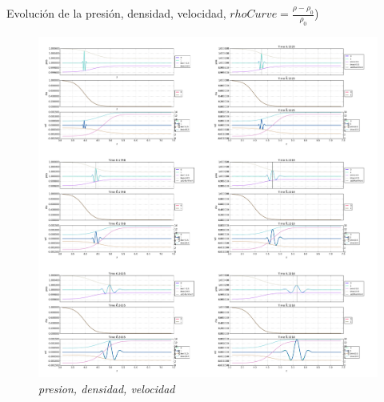 \documentclass{article}
\begin{document}
\begin{description}

\item Evolución de la presión, densidad, velocidad, $rhoCurve = \frac{\rho- \rho_0}{\rho_0} $)
\item \begin{figure}[!ht]
 \centering
 \includegraphics[scale=0.2]{maininhom1.png}
 \caption{\emph{presion, densidad, velocidad}}
\end{figure}


\end{description}
\end{document}
